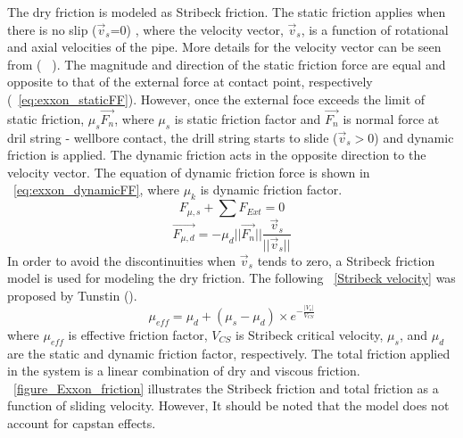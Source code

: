The dry friction is modeled as Stribeck friction.  \resolvedcomment{}  The static friction applies when there is no slip ($\vec{v}_s$=0) , where the velocity vector, $\vec{v}_s$, is a function of rotational and axial velocities of the pipe. More details for the velocity vector can be seen from (~ \cite{ref:cayeux2018a}). The magnitude and direction of the static friction force are equal and opposite to that of the external force at contact point, respectively (\equationname~\ref{eq:exxon_staticFF}). However, once the external foce exceeds the limit of static friction, $\mu_s \vec{F_n}$, where $\mu_s$ is static friction factor and $\vec{F_n}$ is normal force at dril string - wellbore contact, the drill string starts to slide ($\vec{v}_s > 0$) and dynamic friction is applied. The dynamic friction acts in the opposite direction to the velocity vector. The equation of dynamic friction force is shown in \equationname~\ref{eq:exxon_dynamicFF}, where $\mu_k$ is dynamic friction factor.
\begin{equation}\label{eq:exxon_staticFF}
  F_{\mu,s} + \sum F_{Ext} = 0
\end{equation}
\begin{equation}\label{eq:exxon_dynamicFF}
  \vec{F_{\mu, d}} = -\mu_d ||{\vec{F_n}}||\frac{\vec{v}_s}{{||\vec{v}_s}||}
\end{equation}
In order to avoid the discontinuities when $\vec{v}_s$ tends to zero, a Stribeck friction model is used for modeling the dry friction.  The following \equationname~\ref{Stribeck velocity} was proposed by Tunstin (\cite{ref:tustin1947a}).
\begin{equation}\label{Stribeck velocity}
\mu_{eff} = \mu_{d} + (\mu_{s} - \mu_{d})\times e^{-\frac{|V_s|}{V_{CS}}}
\end{equation}
where $\mu_{eff}$ is effective friction factor, $V_{CS}$ is Stribeck critical velocity, $\mu_{s}$, and $\mu_{d}$ are the static and dynamic friction factor, respectively. The total friction applied in the system is a linear combination of dry and viscous friction. \figurename~\ref{figure_Exxon_friction} illustrates the Stribeck friction and total friction as a function of sliding velocity. However, It should be noted that the model does not account for capstan effects. 
